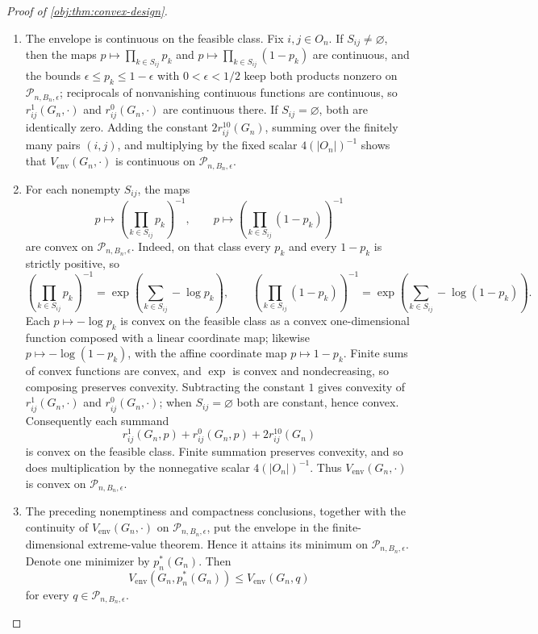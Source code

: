 \documentclass[11pt]{article}
\begin{document}
\begin{proof}[Proof of \cref{obj:thm:convex-design}]
\begin{enumerate}
\item The envelope is continuous on the feasible class.  Fix \(i,j\in O_n\).  If \(S_{ij}\neq\varnothing\), then the maps \(p\mapsto\prod_{k\in S_{ij}}p_k\) and \(p\mapsto\prod_{k\in S_{ij}}(1-p_k)\) are continuous, and the bounds \(\epsilon\le p_k\le1-\epsilon\) with \(0<\epsilon<1/2\) keep both products nonzero on \(\mathcal P_{n,B_n,\epsilon}\); reciprocals of nonvanishing continuous functions are continuous, so \(r_{ij}^1(G_n,\cdot)\) and \(r_{ij}^0(G_n,\cdot)\) are continuous there.  If \(S_{ij}=\varnothing\), both are identically zero.  Adding the constant \(2r_{ij}^{10}(G_n)\), summing over the finitely many pairs \((i,j)\), and multiplying by the fixed scalar \(4(|O_n|)^{-1}\) shows that \(V_{\mathrm{env}}(G_n,\cdot)\) is continuous on \(\mathcal P_{n,B_n,\epsilon}\).

\item For each nonempty \(S_{ij}\), the maps
\[
p\longmapsto
\left(\prod_{k\in S_{ij}}p_k\right)^{-1},
\qquad
p\longmapsto
\left(\prod_{k\in S_{ij}}(1-p_k)\right)^{-1}
\]
are convex on \(\mathcal P_{n,B_n,\epsilon}\).  Indeed, on that class every \(p_k\) and every \(1-p_k\) is strictly positive, so
\[
\left(\prod_{k\in S_{ij}}p_k\right)^{-1}
=\exp\left(\sum_{k\in S_{ij}}-\log p_k\right),
\qquad
\left(\prod_{k\in S_{ij}}(1-p_k)\right)^{-1}
=\exp\left(\sum_{k\in S_{ij}}-\log(1-p_k)\right).
\]
Each \(p\mapsto-\log p_k\) is convex on the feasible class as a convex one-dimensional function composed with a linear coordinate map; likewise \(p\mapsto-\log(1-p_k)\), with the affine coordinate map \(p\mapsto1-p_k\).  Finite sums of convex functions are convex, and \(\exp\) is convex and nondecreasing, so composing preserves convexity.  Subtracting the constant \(1\) gives convexity of \(r^1_{ij}(G_n,\cdot)\) and \(r^0_{ij}(G_n,\cdot)\); when \(S_{ij}=\varnothing\) both are constant, hence convex.  Consequently each summand
\[
r^1_{ij}(G_n,p)+r^0_{ij}(G_n,p)+2r^{10}_{ij}(G_n)
\]
is convex on the feasible class.  Finite summation preserves convexity, and so does multiplication by the nonnegative scalar \(4(|O_n|)^{-1}\).  Thus \(V_{\mathrm{env}}(G_n,\cdot)\) is convex on \(\mathcal P_{n,B_n,\epsilon}\).

\item The preceding nonemptiness and compactness conclusions, together with the continuity of \(V_{\mathrm{env}}(G_n,\cdot)\) on \(\mathcal P_{n,B_n,\epsilon}\), put the envelope in the finite-dimensional extreme-value theorem.  Hence it attains its minimum on \(\mathcal P_{n,B_n,\epsilon}\).  Denote one minimizer by \(p_n^*(G_n)\).  Then
\[
V_{\mathrm{env}}(G_n,p_n^*(G_n))
\le V_{\mathrm{env}}(G_n,q)
\]
for every \(q\in\mathcal P_{n,B_n,\epsilon}\).


\end{enumerate}
\end{proof}
\end{document}
